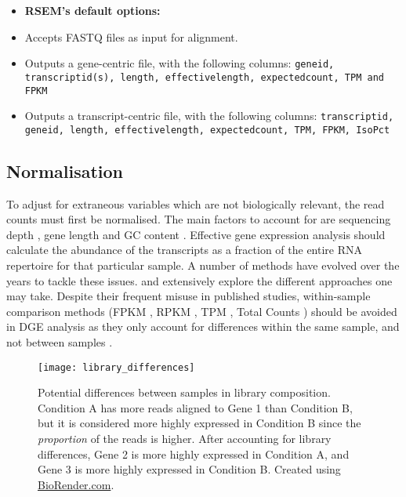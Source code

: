 \begin{itemize}\itemsep0em
\item[] \textbf{RSEM's default options:}
\item Accepts FASTQ files as input for alignment.
\item Outputs a gene-centric file, with the following columns: \texttt{gene\textunderscore id, transcript\textunderscore id(s), length, effective\textunderscore length, expected\textunderscore count, TPM and FPKM}
\item Outputs a transcript-centric file, with the following columns: \texttt{transcript\textunderscore id, gene\textunderscore id, length, effective\textunderscore length, expected\textunderscore count, TPM, FPKM, IsoPct}
\end{itemize}

\subsection{Normalisation}

To adjust for extraneous variables which are not biologically relevant, the read counts must first be normalised. The main factors to account for are sequencing depth \citep{robinson2010scaling}, gene length \citep{oshlack2009transcript} and GC content \citep{risso2011gc}. Effective gene expression analysis should calculate the abundance of the transcripts as a fraction of the entire RNA repertoire for that particular sample. A number of methods have evolved over the years to tackle these issues. \cite{dillies2013comprehensive} and \cite{bullard2010evaluation} extensively explore the different approaches one may take. Despite their frequent misuse in published studies, within-sample comparison methods (FPKM \citep{trapnell2010transcript}, RPKM \citep{mortazavi2008mapping}, TPM \citep{li2011rsem}, Total Counts \citep{dillies2013comprehensive}) should be avoided in \ac{DGE} analysis as they only account for differences within the same sample, and not between samples \citep{dundar2015introduction, zhao2020misuse}.

\begin{figure}[!h]
    \centering
    \texttt{[image: library\_differences]}
    \caption[Differences in library composition between samples]{Potential differences between samples in library composition. Condition A has more reads aligned to Gene 1 than Condition B, but it is considered more highly expressed in Condition B since the \textit{proportion} of the reads is higher. After accounting for library differences, Gene 2 is more highly expressed in Condition A, and Gene 3 is more highly expressed in Condition B. Created using \href{https://biorender.com/}{BioRender.com}. } 
    \label{fig:lib_diff}
\end{figure}

